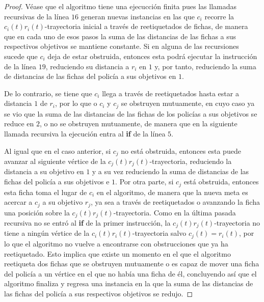 \begin{proof}
    V\'ease que el algoritmo tiene una ejecucci\'on finita pues las llamadas
        recursivas de la l\'inea $16$ generan nuevas instancias en las que $c_i$
        recorre la $c_i(t)r_i(t)$-trayectoria inicial a trav\'es de
        reetiquetados de fichas, de manera que en cada uno de esos pasos la suma
        de las distancias de las fichas a sus respectivos objetivos se mantiene
        constante. Si en alguna de las recursiones sucede que $c_i$ deja de
        estar obstruida, entonces esta podr\'a ejecutar la instrucci\'on de la
        l\'inea $19$, reduciendo su distancia a $r_i$ en $1$ y, por tanto,
        reduciendo la suma de distancias de las fichas del polic\'ia a sus
        objetivos en $1$.
        
        De lo contrario, se tiene que $c_i$ llega a trav\'es de reetiquetados
        hasta estar a distancia $1$ de $r_i$, por lo que o $c_i$ y $c_j$ se
        obstruyen mutuamente, en cuyo caso ya se vio que la suma de las
        distancias de las fichas de los polic\'ias a sus objetivos se reduce en
        $2$, o no se obstruyen mutuamente, de manera que en la siguiente llamada
        recursiva la ejecuci\'on entra al \textbf{if} de la l\'inea $5$.
        
        Al igual que en el caso anterior, si $c_j$ no est\'a obstruida, entonces
        esta puede avanzar al siguiente v\'ertice de la
        $c_j(t)r_j(t)$-trayectoria, reduciendo la distancia a su objetivo en $1$
        y a su vez reduciendo la suma de distancias de las fichas del polic\'ia
        a sus objetivos e $1$. Por otra parte, si $c_j$ est\'a obstruida,
        entonces esta ficha toma el lugar de $c_i$ en el algoritmo, de manera
        que la nueva meta es acercar a $c_j$ a su objetivo $r_j$, ya sea a
        trav\'es de reetiquetados o avanzando la ficha una posici\'on sobre la
        $c_j(t)r_j(t)$-trayectoria. Como en la \'ultima pasada recursiva no se
        entr\'o al \textbf{if} de la primer instrucci\'on, la
        $c_j(t)r_j(t)$-trayectoria no tiene a ning\'un v\'ertice de la
        $c_i(t)r_i(t)$-trayectoria salvo $c_j(t)=r_i(t)$, por lo que el
        algoritmo no vuelve a encontrarse con obstrucciones que ya ha
        reetiquetado. Esto implica que existe un momento en el que el algoritmo
        reetiqueta dos fichas que se obstruyen mutuamente o es capaz de mover
        una ficha del polic\'ia a un v\'ertice en el que no hab\'ia una ficha de
        \'el, concluyendo as\'i que el algoritmo finaliza y regresa una
        instancia en la que la suma de las distancias de las fichas del
        polic\'ia a sus respectivos objetivos se redujo.

\end{proof}

